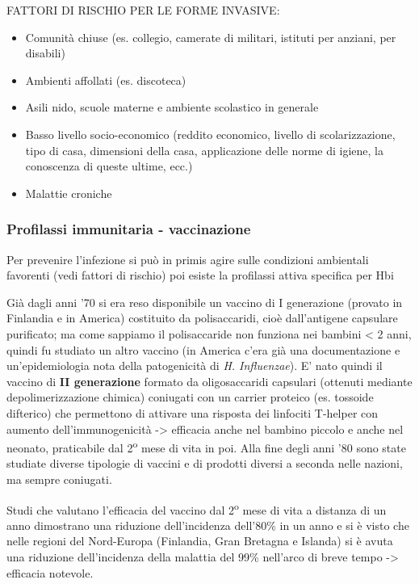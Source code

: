   FATTORI DI RISCHIO PER LE FORME INVASIVE:

\begin{itemize}
\item
  Comunità chiuse (es. collegio, camerate di militari, istituti per
  anziani, per disabili)
\item
  Ambienti affollati (es. discoteca)
\item
  Asili nido, scuole materne e ambiente scolastico in generale
\item
  Basso livello socio-economico (reddito economico, livello di
  scolarizzazione, tipo di casa, dimensioni della casa, applicazione
  delle norme di igiene, la conoscenza di queste ultime, ecc.)
\item
  Malattie croniche
\end{itemize}

\subsubsection{Profilassi immunitaria - vaccinazione}

  Per prevenire l'infezione si può in primis agire sulle condizioni
  ambientali favorenti (vedi fattori di rischio) poi esiste la
  profilassi attiva specifica per Hbi

  Già dagli anni '70 si era reso disponibile un vaccino di I generazione
  (provato in Finlandia e in America) costituito da polisaccaridi, cioè
  dall'antigene capsulare purificato; ma come sappiamo il polisaccaride
  non funziona nei bambini \textless{} 2 anni, quindi fu studiato un
  altro vaccino (in America c'era già una documentazione e
  un'epidemiologia nota della patogenicità di \emph{H. Influenzae}). E'
  nato quindi il vaccino di \textbf{II generazione} formato da
  oligosaccaridi capsulari (ottenuti mediante depolimerizzazione
  chimica) coniugati con un carrier proteico (es. tossoide difterico)
  che permettono di attivare una risposta dei linfociti T-helper con
  aumento dell'immunogenicità -> efficacia anche nel bambino piccolo e
  anche nel neonato, praticabile dal 2\textsuperscript{o} mese di vita in poi. Alla fine
  degli anni '80 sono state studiate diverse tipologie di vaccini e di
  prodotti diversi a seconda nelle nazioni, ma sempre coniugati.

  Studi che valutano l'efficacia del vaccino dal 2\textsuperscript{o} mese di vita a
  distanza di un anno dimostrano una riduzione dell'incidenza dell'80\%
  in un anno e si è visto che nelle regioni del Nord-Europa (Finlandia,
  Gran Bretagna e Islanda) si è avuta una riduzione dell'incidenza della
  malattia del 99\% nell'arco di breve tempo -> efficacia notevole.

